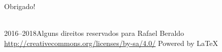 \begin{frame} %
  \Huge
  Obrigado!
\end{frame}

\begin{frame}
  \begin{center}
    \vspace{2em}
    {\LARGE\ccLogo{} \ccAttribution{} \ccShareAlike\\}
    2016--2018\qquad Alguns direitos reservados para Rafael Beraldo
    \vspace{1em}
    \url{http://creativecommons.org/licenses/by-sa/4.0/}
    \vfill
    \huge{Powered by \LaTeX{}}
  \end{center}
\end{frame}
